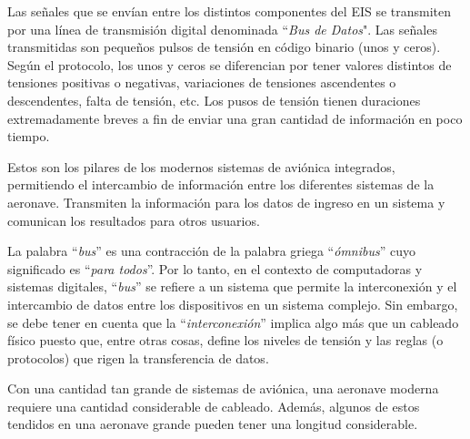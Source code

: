 %



    Las se\~nales que se env\'ian entre los distintos componentes del
    EIS se transmiten por una l\'inea de transmisi\'on digital
    denominada ``{\it Bus de Datos}". Las se\~nales transmitidas son
    peque\~nos pulsos de tensi\'on en c\'odigo binario (unos y
    ceros). Seg\'un el protocolo, los unos y ceros se diferencian por
    tener valores distintos de tensiones positivas o negativas,
    variaciones de tensiones ascendentes o descendentes, falta de
    tensi\'on, etc. Los pusos de tensi\'on tienen duraciones
    extremadamente breves a fin de enviar una gran cantidad de
    informaci\'on en poco tiempo.

Estos son los pilares de los modernos sistemas de avi\'onica integrados, permitiendo el intercambio
de informaci\'on entre los diferentes sistemas de la aeronave. Transmiten la informaci\'on para
los datos de ingreso en un sistema y comunican los resultados para otros usuarios.

La palabra ``\emph{bus}'' es una contracción de la palabra griega ``\emph{ómnibus}'' cuyo significado es  ``\emph{para todos}''. Por lo tanto, en el contexto de computadoras y sistemas digitales, ``\emph{bus}'' se refiere a un sistema que permite la interconexión y el intercambio de datos entre los dispositivos en un sistema complejo. Sin embargo, se debe tener en cuenta que la ``\emph{interconexión}'' implica algo más que un cableado físico puesto que, entre otras cosas, define los niveles de tensión  y las reglas (o protocolos) que rigen la transferencia de datos.

Con una cantidad tan grande de sistemas de aviónica, una aeronave moderna requiere una cantidad considerable de cableado. Además, algunos de estos tendidos en una aeronave grande pueden tener una longitud considerable.

